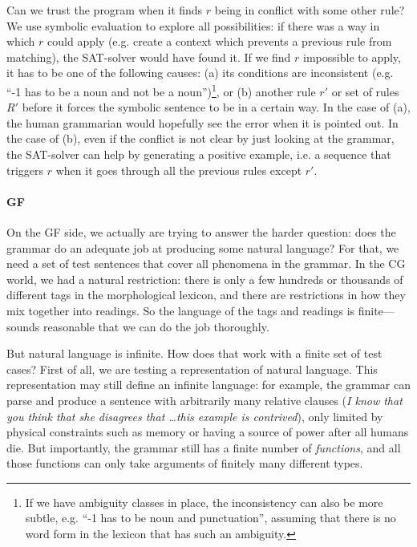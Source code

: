 Can we trust the program when it finds $r$ being in conflict with some
other rule? We use symbolic evaluation to explore all possibilities:
if there was a way in which $r$ could apply (e.g. create a context
which prevents a previous rule from matching), the SAT-solver would
have found it. If we find $r$ impossible to apply, it has to be one of
the following causes: (a) its conditions are inconsistent (e.g. ``-1
has to be a noun and not be a noun'')\footnote{If we have ambiguity
  classes in place, the inconsistency can also be more subtle,
  e.g. ``-1 has to be noun and punctuation'', assuming that there is
  no word form in the lexicon that has such an ambiguity.}, or (b)
another rule $r'$ or set of rules $R'$ before it forces the symbolic
sentence to be in a certain way. In the case of (a), the human
grammarian would hopefully see the error when it is pointed out. In
the case of (b), even if the conflict is not clear by just looking at
the grammar, the SAT-solver can help by generating a positive example,
i.e. a sequence that triggers $r$ when it goes through all the
previous rules except $r'$.


\paragraph{GF} On the GF side, we actually are trying to answer the
harder question: does the grammar do an adequate job at producing
some natural language? For that, we need a set of test sentences that
cover all phenomena in the grammar. In the CG world, we had a natural
restriction: there is only a few hundreds or thousands of different
tags in the morphological lexicon, and there are restrictions in how
they mix together into readings. So the language of the tags and
readings is finite---sounds reasonable that we can do the job
thoroughly.

But natural language is infinite. How does that work with a finite set
of test cases? First of all, we are testing a \pmcfg{} representation
of natural language. This representation may still define an infinite
language: for example, the grammar can parse and produce a sentence
with arbitrarily many relative clauses (\emph{I know that you think
  that she disagrees that \dots this example is contrived}), only
limited by physical constraints such as memory or having a source of
power after all humans die. But importantly, the grammar still has a
finite number of \emph{functions}, and all those functions can only
take arguments of finitely many different types.


